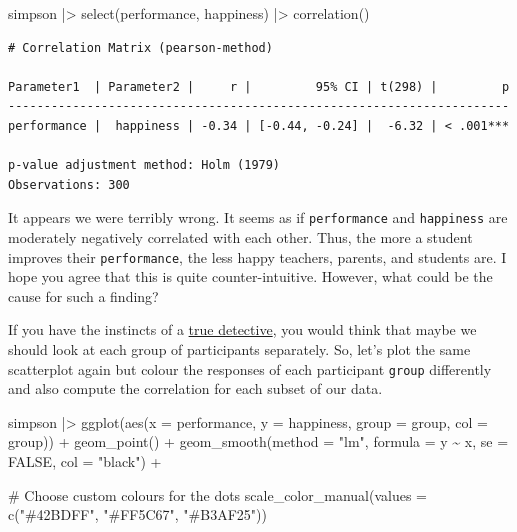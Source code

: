 \documentclass[
  letterpaper,
  DIV=11,
  numbers=noendperiod]{scrreprt}
\newenvironment{Shaded}{\begin{snugshade}}{\end{snugshade}}
\newcommand{\AttributeTok}[1]{\textcolor[rgb]{0.40,0.45,0.13}{#1}}
\newcommand{\CommentTok}[1]{\textcolor[rgb]{0.37,0.37,0.37}{#1}}
\newcommand{\ConstantTok}[1]{\textcolor[rgb]{0.56,0.35,0.01}{#1}}
\newcommand{\FunctionTok}[1]{\textcolor[rgb]{0.28,0.35,0.67}{#1}}
\newcommand{\NormalTok}[1]{\textcolor[rgb]{0.00,0.23,0.31}{#1}}
\newcommand{\SpecialCharTok}[1]{\textcolor[rgb]{0.37,0.37,0.37}{#1}}
\newcommand{\StringTok}[1]{\textcolor[rgb]{0.13,0.47,0.30}{#1}}
\begin{document}
\begin{Shaded}
\begin{Highlighting}[]
\NormalTok{simpson }\SpecialCharTok{|\textgreater{}}
  \FunctionTok{select}\NormalTok{(performance, happiness) }\SpecialCharTok{|\textgreater{}}
  \FunctionTok{correlation}\NormalTok{()}
\end{Highlighting}
\end{Shaded}

\begin{verbatim}
# Correlation Matrix (pearson-method)

Parameter1  | Parameter2 |     r |         95% CI | t(298) |         p
----------------------------------------------------------------------
performance |  happiness | -0.34 | [-0.44, -0.24] |  -6.32 | < .001***

p-value adjustment method: Holm (1979)
Observations: 300
\end{verbatim}

It appears we were terribly wrong. It seems as if \texttt{performance}
and \texttt{happiness} are moderately negatively correlated with each
other. Thus, the more a student improves their \texttt{performance}, the
less happy teachers, parents, and students are. I hope you agree that
this is quite counter-intuitive. However, what could be the cause for
such a finding?

If you have the instincts of a
\href{https://www.imdb.com/title/tt2356777/episodes?season=1}{true
detective}, you would think that maybe we should look at each group of
participants separately. So, let's plot the same scatterplot again but
colour the responses of each participant \texttt{group} differently and
also compute the correlation for each subset of our data.

\begin{Shaded}
\begin{Highlighting}[]
\NormalTok{simpson }\SpecialCharTok{|\textgreater{}}
  \FunctionTok{ggplot}\NormalTok{(}\FunctionTok{aes}\NormalTok{(}\AttributeTok{x =}\NormalTok{ performance,}
             \AttributeTok{y =}\NormalTok{ happiness,}
             \AttributeTok{group =}\NormalTok{ group,}
             \AttributeTok{col =}\NormalTok{ group)) }\SpecialCharTok{+}
  \FunctionTok{geom\_point}\NormalTok{() }\SpecialCharTok{+}
  \FunctionTok{geom\_smooth}\NormalTok{(}\AttributeTok{method =} \StringTok{"lm"}\NormalTok{,}
              \AttributeTok{formula =}\NormalTok{ y }\SpecialCharTok{\textasciitilde{}}\NormalTok{ x,}
              \AttributeTok{se =} \ConstantTok{FALSE}\NormalTok{,}
              \AttributeTok{col =} \StringTok{"black"}\NormalTok{) }\SpecialCharTok{+}

  \CommentTok{\# Choose custom colours for the dots}
  \FunctionTok{scale\_color\_manual}\NormalTok{(}\AttributeTok{values =} \FunctionTok{c}\NormalTok{(}\StringTok{"\#42BDFF"}\NormalTok{, }\StringTok{"\#FF5C67"}\NormalTok{, }\StringTok{"\#B3AF25"}\NormalTok{))}
\end{Highlighting}
\end{Shaded}
\end{document}
